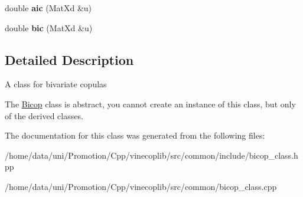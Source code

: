 \begin{DoxyCompactItemize}
\item 
\hypertarget{class_bicop_a0695fc50e014e09fef8c8a4645f3f39f}{double {\bfseries aic} (Mat\+Xd \&u)}\label{class_bicop_a0695fc50e014e09fef8c8a4645f3f39f}

\item 
\hypertarget{class_bicop_a00f1b916a4858e18435e8890838a4ce5}{double {\bfseries bic} (Mat\+Xd \&u)}\label{class_bicop_a00f1b916a4858e18435e8890838a4ce5}

\end{DoxyCompactItemize}


\subsection{Detailed Description}
A class for bivariate copulas

The \hyperlink{class_bicop}{Bicop} class is abstract, you cannot create an instance of this class, but only of the derived classes. 

The documentation for this class was generated from the following files\+:\begin{DoxyCompactItemize}
\item 
/home/data/uni/\+Promotion/\+Cpp/vinecoplib/src/common/include/bicop\+\_\+class.\+hpp\item 
/home/data/uni/\+Promotion/\+Cpp/vinecoplib/src/common/bicop\+\_\+class.\+cpp\end{DoxyCompactItemize}
